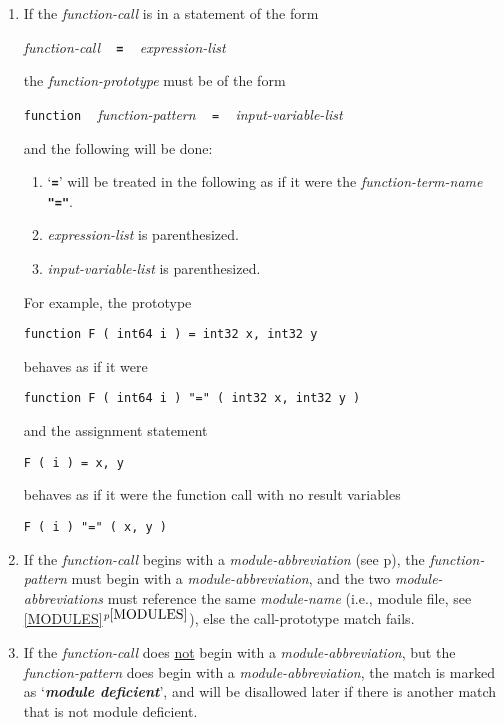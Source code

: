 \documentclass[12pt]{article}
\newcommand{\TT}[1]{{\tt \bfseries #1}}
\newcommand{\key}[1]{{\bf \em #1}\index{#1}}
\newcommand{\itemref}[1]{\ref{#1}$^{p\pageref{#1}}$}
\newcommand{\pagref}[1]{p\pageref{#1}}
\begin{document}
\begin{enumerate}

\item
If the {\em function-call} is in a statement of the form
\begin{center}
{\em function-call} ~ \TT{=} ~ {\em expression-list}
\end{center}
the {\em function-prototype} must be of the form
\begin{center}
{\tt function} ~ {\em function-pattern} ~ {\tt =} ~ {\em input-variable-list} \\
\end{center}
and the following will be done:
\begin{enumerate}
\item `\TT{=}' will be treated in the following as if it were the
{\em function-term-name} \TT{"="}.
\item{\em expression-list} is parenthesized.
\item {\em input-variable-list} is parenthesized.
\end{enumerate}

For example, the prototype
\begin{center}
\tt function F ( int64 i ) = int32 x, int32 y
\end{center}
behaves as if it were
\begin{center}
\tt function F ( int64 i ) "=" ( int32 x, int32 y )
\end{center}
and the assignment statement
\begin{center}
\tt F ( i ) = x, y
\end{center}
behaves as if it were the function call with no result variables
\begin{center}
\tt F ( i ) "=" ( x, y )
\end{center}

\item If the {\em function-call} begins with a {\em module-abbreviation}
(see \pagref{MODULE-ABBREVIATION}), the {\em function-pattern}
must begin with a {\em module-abbreviation}, and the two
{\em module-abbreviations} must reference the same {\em module-name}
(i.e., module file, see \itemref{MODULES}), else the
call-prototype match fails.

\item If the {\em function-call} does \underline{not} begin
with a {\em module-abbreviation}, but the {\em function-pattern}
does begin with a {\em module-abbreviation}, the match is marked
as `\key{module deficient}'\label{MODULE-DEFICIENT},
and will be disallowed later if there is
another match that is not module deficient.


\end{enumerate}
\end{document}
